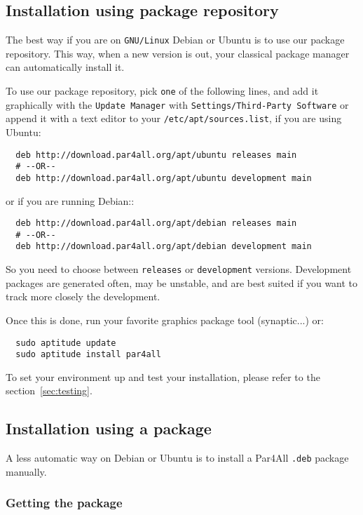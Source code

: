 \documentclass[a4paper]{article}
\begin{document}
\subsection{Installation using \protect\Apfa package repository}

The best way if you are on \texttt{GNU/Linux} Debian or Ubuntu is to use
our package repository. This way, when a new version is out, your
classical package manager can automatically install it.

To use our package repository, pick \texttt{one} of the following lines, and
add it graphically with the \texttt{Update Manager} with
\texttt{Settings/Third-Party Software} or append it with a text editor to
your \texttt{/etc/apt/sources.list}, if you are using Ubuntu:

\begin{verbatim}
  deb http://download.par4all.org/apt/ubuntu releases main
  # --OR--
  deb http://download.par4all.org/apt/ubuntu development main
\end{verbatim}

or if you are running Debian::
\begin{verbatim}
  deb http://download.par4all.org/apt/debian releases main
  # --OR--
  deb http://download.par4all.org/apt/debian development main
\end{verbatim}

So you need to choose between \texttt{releases} or \texttt{development}
versions. Development packages are generated often, may be unstable, and
are best suited if you want to track more closely the \Apfa development.

Once this is done, run your favorite graphics package tool
(synaptic...) or:
\begin{verbatim}
  sudo aptitude update
  sudo aptitude install par4all
\end{verbatim}

To set your environment up and test your \Apfa
installation, please refer to the section~\ref{sec:testing}.


\subsection{Installation using a package}

A less automatic way on Debian or Ubuntu is to install a Par4All
\texttt{.deb} package manually.

\subsubsection{Getting the package}
\end{document}
